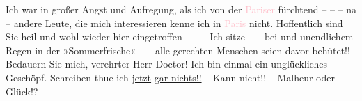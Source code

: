 \pstart
           Ich war in großer Angst und {\pb}Aufregung, als ich von der \textcolor{pink}{Pariser}{}\ledrightnote{\textcolor{pink}{Paris}}{ }\label{K_L03695-2v}\label{} fürchtend – – – na – andere Leute, die mich
               interessieren kenne ich in \textcolor{pink}{Paris}{}\ledrightnote{\textcolor{pink}{Paris}} nicht.
               Hoffentlich sind Sie heil und wohl wieder hier eingetroffen – – – Ich sitze – – bei
                  \label{K_L03695-3v}\label{} und unendlichem Regen in der »Sommerfrische« – – alle gerechten
               Menschen seien davor behütet!! Bedauern Sie mich, verehrter Herr Doctor! Ich bin
               einmal ein unglückliches Geschöpf. Schreiben thue ich \uline{jetzt}{ }\uline{gar nichts!!} – Kann nicht!! – Malheur oder
               Glück!?\pend
           
